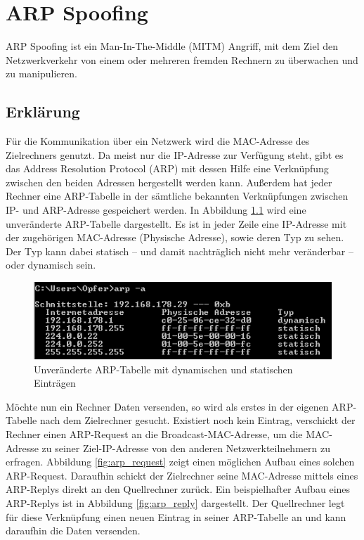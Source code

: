 \chapter{ARP Spoofing}
\label{chapter_arp_spoofing}
ARP Spoofing ist ein Man-In-The-Middle (MITM) Angriff, mit dem Ziel den Netzwerkverkehr von einem oder mehreren fremden Rechnern zu überwachen und zu manipulieren.

\section{Erklärung}
Für die Kommunikation über ein Netzwerk wird die MAC-Adresse des Zielrechners genutzt. Da meist nur die IP-Adresse zur Verfügung steht, gibt es das Address Resolution Protocol (ARP) mit dessen Hilfe eine Verknüpfung zwischen den beiden Adressen hergestellt werden kann. Außerdem hat jeder Rechner eine ARP-Tabelle in der sämtliche bekannten Verknüpfungen zwischen IP- und ARP-Adresse gespeichert werden. In Abbildung \ref{fig:arp_tabelle_vorher} wird eine unveränderte ARP-Tabelle dargestellt. Es ist in jeder Zeile eine IP-Adresse mit der zugehörigen MAC-Adresse (Physische Adresse), sowie deren Typ zu sehen. Der Typ kann dabei statisch -- und damit nachträglich nicht mehr veränderbar -- oder dynamisch sein.

\begin{figure}
	\centering
	\includegraphics[width=\textwidth]{images/ARP_Spoofing/ARP_Tabelle_Vorher}
	\caption{Unveränderte ARP-Tabelle mit dynamischen und statischen Einträgen}
	\label{fig:arp_tabelle_vorher}
\end{figure}

Möchte nun ein Rechner Daten versenden, so wird als erstes in der eigenen ARP-Tabelle nach dem Zielrechner gesucht. Existiert noch kein Eintrag, verschickt der Rechner einen ARP-Request an die Broadcast-MAC-Adresse, um die MAC-Adresse zu seiner Ziel-IP-Adresse von den anderen Netzwerkteilnehmern zu erfragen. Abbildung \ref{fig:arp_request} zeigt einen möglichen Aufbau eines solchen ARP-Request. Daraufhin schickt der Zielrechner seine MAC-Adresse mittels eines ARP-Replys direkt an den Quellrechner zurück. Ein beispielhafter Aufbau eines ARP-Replys ist in Abbildung \ref{fig:arp_reply} dargestellt. Der Quellrechner legt für diese Verknüpfung einen neuen Eintrag in seiner ARP-Tabelle an und kann daraufhin die Daten versenden.

